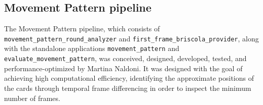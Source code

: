 \documentclass[11pt,a4paper]{article}
\begin{document}
\subsection{Movement Pattern pipeline}
The Movement Pattern pipeline, which consists of \texttt{movement\_}\allowbreak\texttt{pattern\_}\allowbreak\texttt{round\_}\allowbreak\texttt{analyzer} and \texttt{first\_}\allowbreak\texttt{frame\_}\allowbreak\texttt{briscola\_}\allowbreak\texttt{provider},
along with the standalone applications \texttt{movement\_}\allowbreak\texttt{pattern} and \texttt{evaluate\_}\allowbreak\texttt{movement\_}\allowbreak\texttt{pattern},
was conceived, designed, developed, tested, and performance-optimized by Martina Naldoni.
It was designed with the goal of achieving high computational efficiency,
identifying the approximate positions of the cards through temporal frame differencing
in order to inspect the minimum number of frames.
\end{document}
